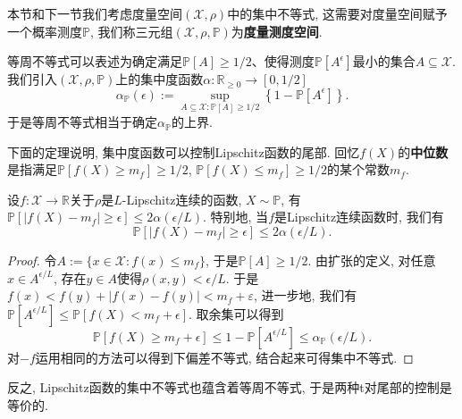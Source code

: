 本节和下一节我们考虑度量空间$(\mathcal{X}, \rho)$中的集中不等式, 这需要对度量空间赋予一个概率测度$\mathbb{P}$, 我们称三元组$(\mathcal{X}, \rho, \mathbb{P})$为\textbf{度量测度空间}. 

等周不等式可以表述为确定满足$\mathbb{P}[A] \geq 1/2$、使得测度$\mathbb{P}[A^{\epsilon}]$最小的集合$A \subseteq \mathcal{X}$.
我们引入$(\mathcal{X}, \rho, \mathbb{P})$上的集中度函数$\alpha \colon \mathbb{R}_{\geq 0} \to [0, 1/2]$
\begin{equation*}
	\alpha_{\mathbb{P}}(\epsilon)
	:= \sup_{A \subseteq \mathcal{X} \colon \mathbb{P}[A] \geq 1/2} \left\{ 1 - \mathbb{P}[A^{\epsilon}] \right\}. 
\end{equation*}
于是等周不等式相当于确定$\alpha_{\mathbb{P}}$的上界. 

下面的定理说明, 集中度函数可以控制Lipschitz函数的尾部. 
回忆$f(X)$的\textbf{中位数}是指满足$\mathbb{P}[f(X) \geq m_f] \geq 1/2$, $\mathbb{P}[f(X) \leq m_f] \geq 1/2$的某个常数$m_f$. 

\begin{theorem}[Lévy不等式]
	设$f \colon \mathcal{X} \to \mathbb{R}$关于$\rho$是$L$-Lipschitz连续的函数, $X \sim \mathbb{P}$, 有$\mathbb{P}[ |f(X) - m_f| \geq \epsilon] \leq 2 \alpha(\epsilon / L)$. 
	特别地, 当$f$是Lipschitz连续函数时, 我们有
	\begin{equation*}
		\mathbb{P}[ |f(X) - m_f| \geq \epsilon] \leq 2 \alpha(\epsilon / L). 
	\end{equation*}
\end{theorem}
\begin{proof}
	令$A := \{x \in \mathcal{X} \colon f(x) \leq m_f\}$, 于是$\mathbb{P}[A] \geq 1/2$. 
	由扩张的定义, 对任意$x \in A^{\epsilon / L}$, 存在$y \in A$使得$\rho(x,y) < \epsilon / L$. 
	于是$f(x) < f(y) + |f(x) - f(y)| < m_f + \varepsilon$, 进一步地, 我们有$\mathbb{P}[A^{\epsilon / L}] \leq \mathbb{P}[f(X) < m_f + \epsilon]$. 
	取余集可以得到
	\begin{equation*}
		\mathbb{P}[f(X) \geq m_f + \epsilon] 
		\leq 1 - \mathbb{P}[A^{\epsilon / L}] 
		\leq \alpha_{\mathbb{P}}(\epsilon / L). 
	\end{equation*}
	对$-f$运用相同的方法可以得到下偏差不等式, 结合起来可得集中不等式. 
\end{proof}

反之, Lipschitz函数的集中不等式也蕴含着等周不等式, 于是两种t对尾部的控制是等价的. 

